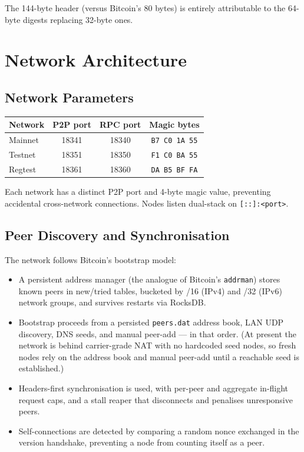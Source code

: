 \documentclass[11pt,a4paper]{article}
\begin{document}
The 144-byte header (versus Bitcoin's 80 bytes) is entirely attributable to the 64-byte digests replacing 32-byte ones.

\section{Network Architecture}

\subsection{Network Parameters}

\begin{center}
\begin{tabular}{lccc}
\toprule
\textbf{Network} & \textbf{P2P port} & \textbf{RPC port} & \textbf{Magic bytes} \\
\midrule
Mainnet & 18341 & 18340 & \texttt{B7 C0 1A 55} \\
Testnet & 18351 & 18350 & \texttt{F1 C0 BA 55} \\
Regtest & 18361 & 18360 & \texttt{DA B5 BF FA} \\
\bottomrule
\end{tabular}
\end{center}

Each network has a distinct P2P port and 4-byte magic value, preventing accidental cross-network connections. Nodes listen dual-stack on \texttt{[::]:<port>}.

\subsection{Peer Discovery and Synchronisation}

The network follows Bitcoin's bootstrap model:

\begin{itemize}[leftmargin=1.5em,itemsep=2pt]
\item A persistent address manager (the analogue of Bitcoin's \texttt{addrman}) stores known peers in new/tried tables, bucketed by /16 (IPv4) and /32 (IPv6) network groups, and survives restarts via RocksDB.
\item Bootstrap proceeds from a persisted \texttt{peers.dat} address book, LAN UDP discovery, DNS seeds, and manual peer-add --- in that order. (At present the network is behind carrier-grade NAT with no hardcoded seed nodes, so fresh nodes rely on the address book and manual peer-add until a reachable seed is established.)
\item Headers-first synchronisation is used, with per-peer and aggregate in-flight request caps, and a stall reaper that disconnects and penalises unresponsive peers.
\item Self-connections are detected by comparing a random nonce exchanged in the version handshake, preventing a node from counting itself as a peer.
\end{itemize}
\end{document}
